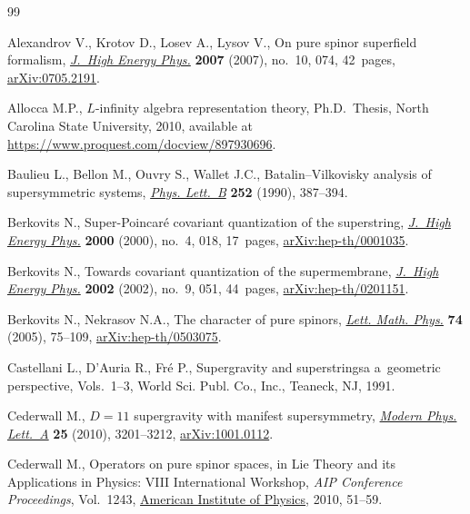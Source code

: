 \documentclass[10pt,a4paper]{amsart}
\numberwithin{equation}{section}
\begin{document}

\begin{thebibliography}{99}
\footnotesize\itemsep=0pt

Alexandrov V., Krotov D., Losev A., Lysov V., On pure spinor superfield
 formalism, \href{https://doi.org/10.1088/1126-6708/2007/10/074}{\textit{J.~High Energy Phys.}} \textbf{2007} (2007), no.~10, 074,
 42~pages, \href{https://arxiv.org/abs/0705.2191}{arXiv:0705.2191}.

Allocca M.P., $L$-infinity algebra representation theory, Ph.D.~Thesis,
 {N}orth Carolina State University, 2010, available at
 \url{https://www.proquest.com/docview/897930696}.

Baulieu L., Bellon M., Ouvry S., Wallet J.C., Batalin--{V}ilkovisky analysis of
 supersymmetric systems, \href{https://doi.org/10.1016/0370-2693(90)90557-M}{\textit{Phys. Lett.~B}} \textbf{252} (1990), 387--394.

Berkovits N., Super-{P}oincar\'e covariant quantization of the superstring,
 \href{https://doi.org/10.1088/1126-6708/2000/04/018}{\textit{J.~High Energy Phys.}} \textbf{2000} (2000), no.~4, 018, 17~pages,
 \href{https://arxiv.org/abs/hep-th/0001035}{arXiv:hep-th/0001035}.

Berkovits N., Towards covariant quantization of the supermembrane,
 \href{https://doi.org/10.1088/1126-6708/2002/09/051}{\textit{J.~High Energy Phys.}} \textbf{2002} (2002), no.~9, 051, 44~pages,
 \href{https://arxiv.org/abs/hep-th/0201151}{arXiv:hep-th/0201151}.

Berkovits N., Nekrasov N.A., The character of pure spinors, \href{https://doi.org/10.1007/s11005-005-0009-7}{\textit{Lett. Math.
 Phys.}} \textbf{74} (2005), 75--109, \href{https://arxiv.org/abs/hep-th/0503075}{arXiv:hep-th/0503075}.

Castellani L., D'Auria R., Fr\'e P., Supergravity and superstringsa a~geometric
 perspective, {V}ols.~1--3, World Sci. Publ. Co., Inc., Teaneck, NJ, 1991.

Cederwall M., {$D=11$} supergravity with manifest supersymmetry, \href{https://doi.org/10.1142/S0217732310034407}{\textit{Modern
 Phys. Lett.~A}} \textbf{25} (2010), 3201--3212, \href{https://arxiv.org/abs/1001.0112}{arXiv:1001.0112}.

Cederwall M., Operators on pure spinor spaces, in Lie Theory and its
 Applications in Physics: {VIII} International Workshop, \textit{AIP
 Conference Proceedings}, Vol.~1243, \href{https://doi.org/10.1063/1.3460180}{American Institute of Physics}, 2010,
 51--59.


\end{thebibliography}
\end{document}
